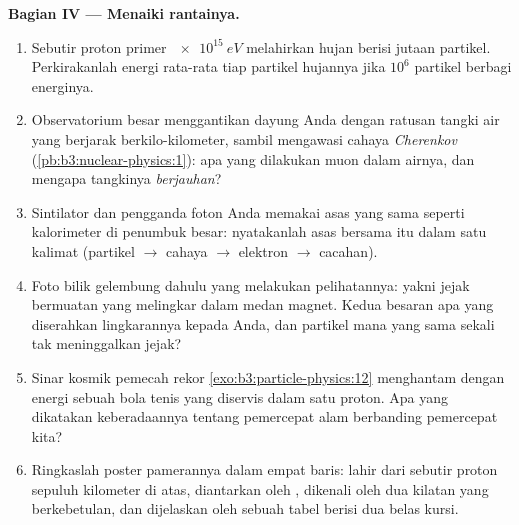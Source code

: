 \begin{problem}
\medskip\noindent\textbf{Bagian IV --- Menaiki rantainya.}

\begin{enumerate}[resume]
  \item Sebutir proton primer $\qty{e15}{eV}$ melahirkan hujan berisi
        jutaan partikel. Perkirakanlah energi rata-rata tiap partikel hujannya
        jika $10^{6}$ partikel berbagi energinya.
  \item Observatorium besar menggantikan dayung Anda dengan ratusan
        tangki air yang berjarak berkilo-kilometer, sambil mengawasi
        cahaya \emph{Cherenkov} (\cref{pb:b3:nuclear-physics:1}):
        apa yang dilakukan muon dalam airnya, dan mengapa tangkinya
        \emph{berjauhan}?
  \item Sintilator dan pengganda foton Anda memakai asas yang sama
        seperti kalorimeter di penumbuk besar:
        nyatakanlah asas bersama itu dalam satu kalimat
        (partikel $\to$ cahaya $\to$ elektron $\to$ cacahan).
  \item Foto bilik gelembung dahulu yang melakukan pelihatannya: yakni jejak
        bermuatan yang melingkar dalam medan magnet. Kedua besaran apa
        yang diserahkan lingkarannya kepada Anda, dan partikel mana yang sama sekali tak
        meninggalkan jejak?
  \item Sinar kosmik pemecah rekor
        \cref{exo:b3:particle-physics:12} menghantam dengan energi
        sebuah bola tenis yang diservis dalam satu proton. Apa yang dikatakan
        keberadaannya tentang pemercepat alam berbanding pemercepat kita?
  \item Ringkaslah poster pamerannya dalam empat baris: lahir dari sebutir
        proton sepuluh kilometer di atas, diantarkan oleh ,
        dikenali oleh dua kilatan yang berkebetulan, dan dijelaskan oleh sebuah
        tabel berisi dua belas kursi.
\end{enumerate}
\end{problem}
